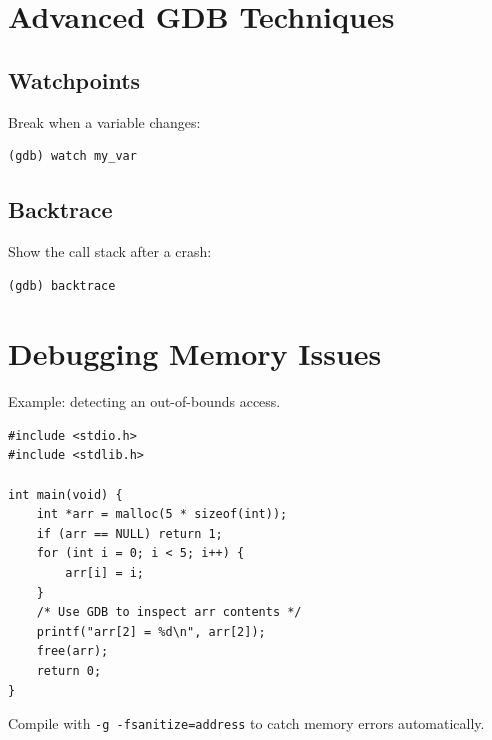 \documentclass[11pt,a4paper]{article}
\begin{document}
\section{Advanced GDB Techniques}
\subsection{Watchpoints}
Break when a variable changes:
\begin{verbatim}
(gdb) watch my_var
\end{verbatim}

\subsection{Backtrace}
Show the call stack after a crash:
\begin{verbatim}
(gdb) backtrace
\end{verbatim}

\section{Debugging Memory Issues}
Example: detecting an out-of-bounds access.

\begin{lstlisting}
#include <stdio.h>
#include <stdlib.h>

int main(void) {
    int *arr = malloc(5 * sizeof(int));
    if (arr == NULL) return 1;
    for (int i = 0; i < 5; i++) {
        arr[i] = i;
    }
    /* Use GDB to inspect arr contents */
    printf("arr[2] = %d\n", arr[2]);
    free(arr);
    return 0;
}
\end{lstlisting}

Compile with \texttt{-g -fsanitize=address} to catch memory errors automatically.
\end{document}
